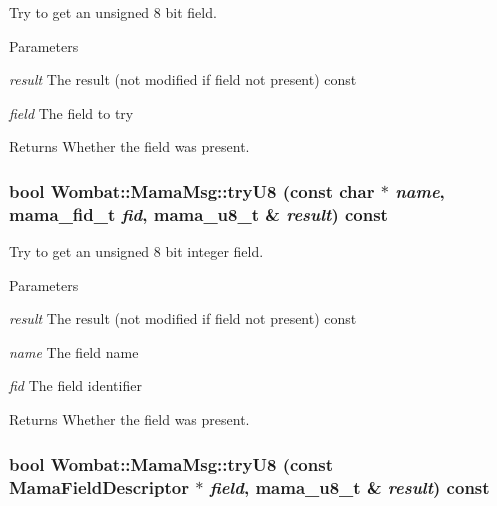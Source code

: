 Try to get an unsigned 8 bit field. 
\begin{DoxyParams}{Parameters}
\item[{\em result}]The result (not modified if field not present) const \item[{\em field}]The field to try \end{DoxyParams}
\begin{DoxyReturn}{Returns}
Whether the field was present. 
\end{DoxyReturn}
\hypertarget{classWombat_1_1MamaMsg_a320d1e1e35a76f9ea1a2c610a3f6d678}{
\subsubsection[{tryU8}]{\setlength{\rightskip}{0pt plus 5cm}bool Wombat::MamaMsg::tryU8 (const char $\ast$ {\em name}, \/  mama\_\-fid\_\-t {\em fid}, \/  mama\_\-u8\_\-t \& {\em result}) const}}
\label{classWombat_1_1MamaMsg_a320d1e1e35a76f9ea1a2c610a3f6d678}


Try to get an unsigned 8 bit integer field. 
\begin{DoxyParams}{Parameters}
\item[{\em result}]The result (not modified if field not present) const \item[{\em name}]The field name \item[{\em fid}]The field identifier \end{DoxyParams}
\begin{DoxyReturn}{Returns}
Whether the field was present. 
\end{DoxyReturn}
\hypertarget{classWombat_1_1MamaMsg_abbb5f42e61b935638217344a2fc5a7cb}{
\subsubsection[{tryU8}]{\setlength{\rightskip}{0pt plus 5cm}bool Wombat::MamaMsg::tryU8 (const {\bf MamaFieldDescriptor} $\ast$ {\em field}, \/  mama\_\-u8\_\-t \& {\em result}) const}}
\label{classWombat_1_1MamaMsg_abbb5f42e61b935638217344a2fc5a7cb}


